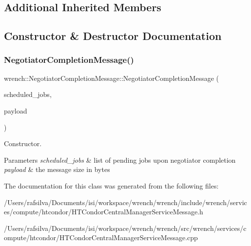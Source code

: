 \subsection*{Additional Inherited Members}


\subsection{Constructor \& Destructor Documentation}
\mbox{\label{classwrench_1_1_negotiator_completion_message_aece506a0df6a8a5bf7484467f05c9b19}} 
\subsubsection{\texorpdfstring{Negotiator\+Completion\+Message()}{NegotiatorCompletionMessage()}}
{\footnotesize\ttfamily wrench\+::\+Negotiator\+Completion\+Message\+::\+Negotiator\+Completion\+Message (\begin{DoxyParamCaption}\item[{std\+::vector$<$ \hyperlink{classwrench_1_1_standard_job}{Standard\+Job} $\ast$$>$}]{scheduled\+\_\+jobs,  }\item[{double}]{payload }\end{DoxyParamCaption})}



Constructor. 


\begin{DoxyParams}{Parameters}
{\em scheduled\+\_\+jobs} & list of pending jobs upon negotiator completion \\
\hline
{\em payload} & the message size in bytes \\
\hline
\end{DoxyParams}


The documentation for this class was generated from the following files\+:\begin{DoxyCompactItemize}
\item 
/\+Users/rafsilva/\+Documents/isi/workspace/wrench/wrench/include/wrench/services/compute/htcondor/H\+T\+Condor\+Central\+Manager\+Service\+Message.\+h\item 
/\+Users/rafsilva/\+Documents/isi/workspace/wrench/wrench/src/wrench/services/compute/htcondor/H\+T\+Condor\+Central\+Manager\+Service\+Message.\+cpp\end{DoxyCompactItemize}
